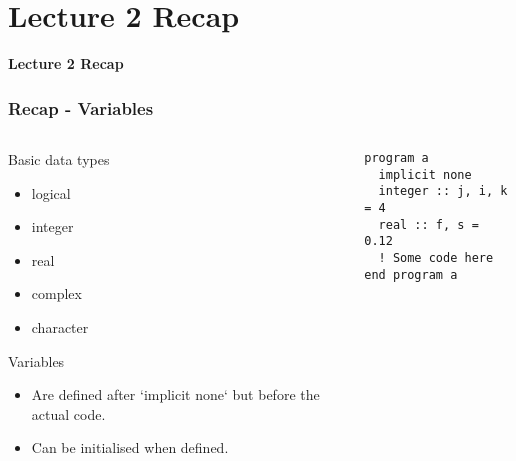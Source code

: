 \section{Lecture 2 Recap}

\begin{frame}
	\centering
	\Huge \textbf{Lecture 2 Recap}
\end{frame}


\begin{frame}[fragile]
  \frametitle{Recap - Variables}
  \begin{columns}[T]
    \begin{column}{0.5\textwidth}
    \begin{block}{Basic data types}
      \begin{itemize}
          \item logical
          \item integer
          \item real
          \item complex
          \item character
      \end{itemize}
    \end{block}

    \begin{block}{Variables}
      \begin{itemize}
        \item Are defined after `implicit none` but before the actual code.
        \item Can be initialised when defined.
      \end{itemize}        
    \end{block}
    \end{column}
    
    \begin{column}{0.5\textwidth}
      \begin{lstlisting}
program a
  implicit none
  integer :: j, i, k = 4
  real :: f, s = 0.12
  ! Some code here
end program a
      \end{lstlisting}
    \end{column}
  \end{columns}
\end{frame}


